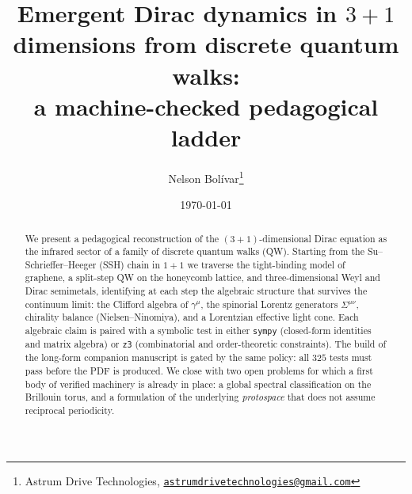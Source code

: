 \documentclass[11pt,a4paper]{article}
\title{Emergent Dirac dynamics in \texorpdfstring{$3{+}1$}{(3+1)} dimensions
       from discrete quantum walks:\\
       a machine-checked pedagogical ladder}
\author{Nelson Bol\'ivar\thanks{Astrum Drive Technologies, \href{mailto:astrumdrivetechnologies@gmail.com}{\nolinkurl{astrumdrivetechnologies@gmail.com}}}}
\date{\today}
\begin{document}
\maketitle

\begin{abstract}
We present a pedagogical reconstruction of the $(3{+}1)$-dimensional Dirac
equation as the infrared sector of a family of discrete quantum walks (QW).
Starting from the Su--Schrieffer--Heeger (SSH) chain in $1{+}1$ we traverse
the tight-binding model of graphene, a split-step QW on the honeycomb
lattice, and three-dimensional Weyl and Dirac semimetals, identifying at
each step the algebraic structure that survives the continuum limit: the
Clifford algebra of $\gamma^{\mu}$, the spinorial Lorentz generators
$\Sigma^{\mu\nu}$, chirality balance (Nielsen--Ninomiya), and a Lorentzian
effective light cone. Each algebraic claim is paired with a symbolic test
in either \texttt{sympy} (closed-form identities and matrix algebra) or
\texttt{z3} (combinatorial and order-theoretic constraints). The
build of the long-form companion manuscript is gated by the same
policy: all $325$ tests must pass before the PDF is produced. We close with two open problems for which a first body
of verified machinery is already in place: a global spectral
classification on the Brillouin torus, and a formulation of the underlying
\emph{protospace} that does not assume reciprocal periodicity.
\end{abstract}















\end{document}
